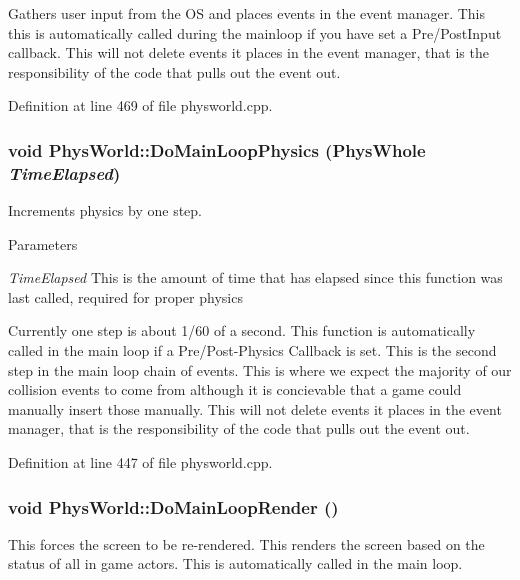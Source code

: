Gathers user input from the OS and places events in the event manager. This this is automatically called during the mainloop if you have set a Pre/PostInput callback. This will not delete events it places in the event manager, that is the responsibility of the code that pulls out the event out. 

Definition at line 469 of file physworld.cpp.\hypertarget{classPhysWorld_a4d8e06d2f8459a286eb01e68df2d1828}{
\subsubsection[{DoMainLoopPhysics}]{\setlength{\rightskip}{0pt plus 5cm}void PhysWorld::DoMainLoopPhysics (PhysWhole {\em TimeElapsed})}}
\label{db/df5/classPhysWorld_a4d8e06d2f8459a286eb01e68df2d1828}


Increments physics by one step. 
\begin{DoxyParams}{Parameters}
\item[{\em TimeElapsed}]This is the amount of time that has elapsed since this function was last called, required for proper physics\end{DoxyParams}
Currently one step is about 1/60 of a second. This function is automatically called in the main loop if a Pre/Post-\/Physics Callback is set. This is the second step in the main loop chain of events. This is where we expect the majority of our collision events to come from although it is concievable that a game could manually insert those manually. This will not delete events it places in the event manager, that is the responsibility of the code that pulls out the event out. 

Definition at line 447 of file physworld.cpp.\hypertarget{classPhysWorld_a8f33541d67164a2452e568443e9905be}{
\subsubsection[{DoMainLoopRender}]{\setlength{\rightskip}{0pt plus 5cm}void PhysWorld::DoMainLoopRender ()}}
\label{db/df5/classPhysWorld_a8f33541d67164a2452e568443e9905be}


This forces the screen to be re-\/rendered. This renders the screen based on the status of all in game actors. This is automatically called in the main loop. 

